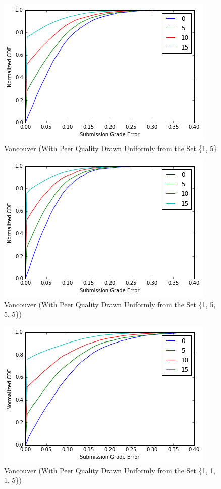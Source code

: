\documentclass{article}
\begin{document}
	\begin{figure}[h]
		\includegraphics{vancouver-bimodal.png}
		\caption{Vancouver (With Peer Quality Drawn Uniformly from the Set \{1, 5\}}
		\label{fig:vancouver-bimodal}
	\end{figure}
	
	\begin{figure}[h]
		\includegraphics{vancouver-skewed.png}
		\caption{Vancouver (With Peer Quality Drawn Uniformly from the Set \{1, 5, 5, 5\})}
		\label{fig:vancouver-skewed}
	\end{figure}
	
	\begin{figure}[h]
		\includegraphics{vancouver-skewed-low.png}
		\caption{Vancouver (With Peer Quality Drawn Uniformly from the Set \{1, 1, 1, 5\})}
		\label{fig:vancouver-skewed-low}
	\end{figure}
	
\end{document}
